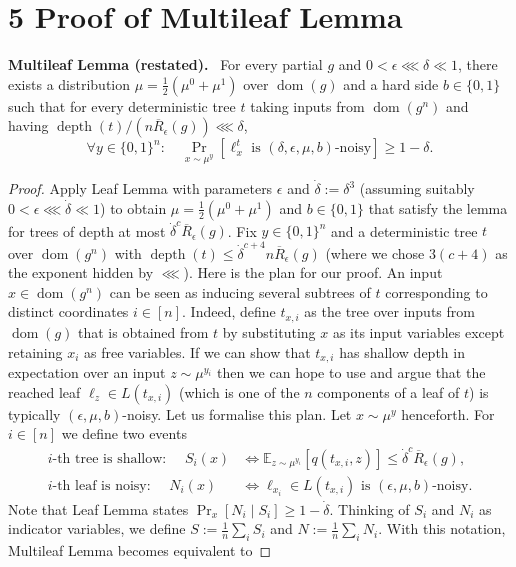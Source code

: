 \documentclass[10pt,a4paper]{article}
\newenvironment{authorclaim}[1]{\par\medskip\noindent\textbf{#1.}\ }{\par\medskip}
\begin{document}
\section*{5 Proof of Multileaf Lemma}
\begin{authorclaim}{Multileaf Lemma (restated)}
For every partial $g$ and $0<\epsilon\lll\delta\ll1$, there exists a distribution $\mu=\frac12(\mu^0+\mu^1)$ over $\operatorname{dom}(g)$ and a hard side $b\in\{0,1\}$ such that for every deterministic tree $t$ taking inputs from $\operatorname{dom}(g^n)$ and having $\operatorname{depth}(t)/(n\overline R_\epsilon(g))\lll\delta$,
\[\forall y\in\{0,1\}^n:\quad\Pr_{x\sim\mu^y}[\ell_x^t\text{ is }(\delta,\epsilon,\mu,b)\text{-noisy}]\ge1-\delta.\]
\end{authorclaim}
\begin{proof}
Apply Leaf Lemma with parameters $\epsilon$ and $\dot\delta:=\delta^3$ (assuming suitably $0<\epsilon\lll\dot\delta\ll1$) to obtain $\mu=\frac12(\mu^0+\mu^1)$ and $b\in\{0,1\}$ that satisfy the lemma for trees of depth at most $\dot\delta^c\overline R_\epsilon(g)$. Fix $y\in\{0,1\}^n$ and a deterministic tree $t$ over $\operatorname{dom}(g^n)$ with $\operatorname{depth}(t)\le\dot\delta^{c+4}n\overline R_\epsilon(g)$ (where we chose $3(c+4)$ as the exponent hidden by $\lll$).
Here is the plan for our proof. An input $x\in\operatorname{dom}(g^n)$ can be seen as inducing several subtrees of $t$ corresponding to distinct coordinates $i\in[n]$. Indeed, define $t_{x,i}$ as the tree over inputs from $\operatorname{dom}(g)$ that is obtained from $t$ by substituting $x$ as its input variables except retaining $x_i$ as free variables. If we can show that $t_{x,i}$ has shallow depth in expectation over an input $z\sim\mu^{y_i}$ then we can hope to use and argue that the reached leaf $\ell_z\in L(t_{x,i})$ (which is one of the $n$ components of a leaf of $t$) is typically $(\epsilon,\mu,b)$-noisy.
Let us formalise this plan. Let $x\sim\mu^y$ henceforth. For $i\in[n]$ we define two events
\begin{align*}
\text{$i$-th tree is shallow: }\quad S_i(x)&\Longleftrightarrow\mathbb E_{z\sim\mu^{y_i}}[q(t_{x,i},z)]\le\dot\delta^c\overline R_\epsilon(g),\\
\text{$i$-th leaf is noisy: }\quad N_i(x)&\Longleftrightarrow\ell_{x_i}\in L(t_{x,i})\text{ is }(\epsilon,\mu,b)\text{-noisy}.
\end{align*}
Note that Leaf Lemma states $\Pr_x[N_i\mid S_i]\ge1-\dot\delta$. Thinking of $S_i$ and $N_i$ as indicator variables, we define $S:=\frac1n\sum_iS_i$ and $N:=\frac1n\sum_iN_i$. With this notation, Multileaf Lemma becomes equivalent to

\end{proof}
\end{document}
